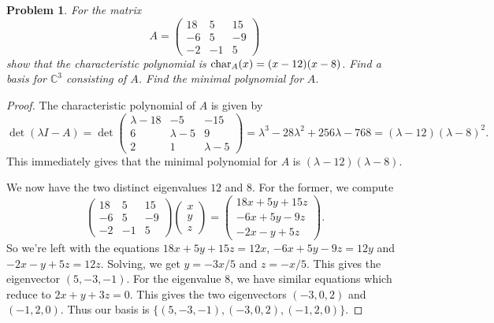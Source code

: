 \documentclass{article}
\newtheorem{problem}{Problem}
\renewcommand{\char}{\textup{char}}
\begin{document}
\begin{problem}
For the matrix
\[
A = 
\left (
\begin{array}{ccc}
18 & 5 & 15\\
-6 & 5 & -9\\
-2 & -1 & 5
\end{array}
\right )
\]
show that the characteristic polynomial is $\char_A(x) = (x-12)(x-8)$. Find a basis for $\mathbb{C}^3$ consisting of $A$. Find the minimal polynomial for $A$.
\end{problem}
\begin{proof}
The characteristic polynomial of $A$ is given by
\[
\det (\lambda I - A) = \det
\left (
\begin{array}{ccc}
\lambda-18 & -5 & -15\\
6 & \lambda-5 & 9\\
2 & 1 & \lambda-5
\end{array}
\right )
= \lambda^3 - 28 \lambda^2 + 256 \lambda - 768 = (\lambda-12)(\lambda-8)^2.
\]
This immediately gives that the minimal polynomial for $A$ is $(\lambda - 12)(\lambda - 8)$.

We now have the two distinct eigenvalues $12$ and $8$. For the former, we compute
\[
\left (
\begin{array}{ccc}
18 & 5 & 15\\
-6 & 5 & -9\\
-2 & -1 & 5
\end{array}
\right )
\left (
\begin{array}{c}
x\\
y\\
z
\end{array}
\right )
=
\left (
\begin{array}{c}
18x + 5y + 15z\\
-6x + 5y -9z\\
-2x - y + 5z
\end{array}
\right ).
\]
So we're left with the equations $18x + 5y + 15z = 12x$, $-6x + 5y - 9z = 12y$ and $-2x - y + 5z = 12z$. Solving, we get $y = -3x/5$ and $z = -x/5$. This gives the eigenvector $(5, -3, -1)$. For the eigenvalue $8$, we have similar equations which reduce to $2x + y + 3z = 0$. This gives the two eigenvectors $(-3, 0, 2)$ and $(-1, 2, 0)$. Thus our basis is $\{(5, -3, -1), (-3, 0, 2), (-1, 2, 0)\}$.
\end{proof}
\end{document}
